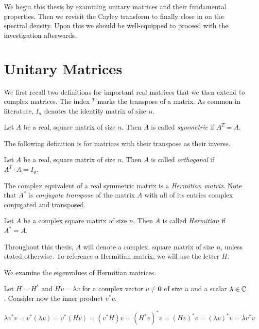 We begin this thesis by examining unitary matrices and their fundamental properties.
Then we revisit the Cayley transform to finally close in on the spectral density.
Upon this we should be well-equipped to proceed with the investigation afterwards.

\section{Unitary Matrices}

We first recall two definitions for important real matrices that we then extend to complex matrices.
The index $^T$ marks the transpose of a matrix.
As common in literature, $I_n$ denotes the identity matrix of size $n$.

\begin{definition}
    Let $A$ be a real, square matrix of size $n$.
    Then $A$ is called \emph{symmetric} if $A^T = A$.
\end{definition}

The following definition is for matrices with their transpose as their inverse.

\begin{definition}
    Let $A$ be a real, square matrix of size $n$.
    Then $A$ is called \emph{orthogonal} if $A^T \cdot A = I_n$.
\end{definition}

The complex equivalent of a real symmetric matrix is a \emph{Hermitian matrix}.
Note that $A^*$ is \emph{conjugate transpose} of the matrix $A$ with all of its entries complex conjugated and transposed.

\begin{definition}
    Let $A$ be a complex square matrix of size $n$.
    Then $A$ is called \emph{Hermitian} if $A^* = A$.
\end{definition}

Throughout this thesis, $A$ will denote a complex, square matrix of size $n$,
unless stated otherwise.
To reference a Hermitian matrix, we will use the letter $H$.

We examine the eigenvalues of Hermitian matrices.

Let $H = H^*$ and $H v = \lambda v$ for a complex vector $v \neq \mathbf{0}$ of size $n$ and a scalar $\lambda \in \mathbb{C}$.
Consider now the inner product $ v^* v$.

\begin{equation} \label{eq:real_symmetric_inner_product}
    \lambda v^* v = v^* \left( \lambda v \right)
    = v^* \left( H v \right)
    = \left(v^* H \right) v
    = \left( H^* v \right)^* v
    = \left( H v \right)^* v
    = (\lambda v)^* v
    = \overline{\lambda} v^* v
\end{equation}


